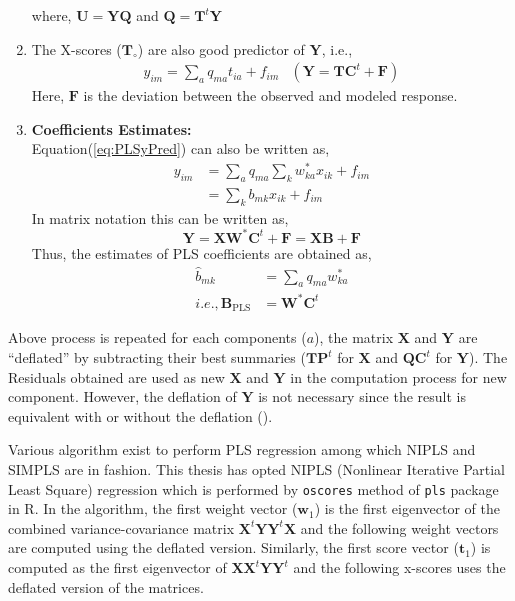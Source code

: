 \documentclass[12pt, lot, lof]{thesis}\usepackage[]{graphicx}\usepackage[]{color}
\newcommand{\bs}[1]{\ensuremath{\boldsymbol{#1}}}
\begin{document}
\begin{enumerate}
{where, $\bs{U}=\bs{YQ}$ and $\bs{Q}=\bs{T}^t\bs{Y}$
}
\item{
The X-scores ($\bs{T_\circ}$) are also good predictor of \bs{Y}, i.e.,
\begin{eqnarray}
\label{eq:PLSyPred}
y_{im}=\sum_a{q_{ma}t_{ia}+f_{im}} & (\bs{Y}=\bs{TC}^t+\bs{F})
\end{eqnarray}
Here, \bs{F} is the deviation between the observed and modeled response.
}
\item{
\textbf{Coefficients Estimates:}\\
Equation(\ref{eq:PLSyPred}) can also be written as,
\begin{align*}
y_{im}&=\sum_a{q_{ma}\sum_k{w_{ka}^*x_{ik}}}+f_{im}\\
&=\sum_k{b_{mk}x_{ik}}+f_{im}
\end{align*}
In matrix notation this can be written as,
\begin{equation}
\bs{Y}=\bs{XW}^*\bs{C}^t+\bs{F}=\bs{XB}+\bs{F}
\end{equation}
Thus, the estimates of PLS coefficients are obtained as,
\begin{align}
\hat{b}_{mk}&=\sum_a{q_{ma}w_{ka}^*}\\
i.e., \bs{B}_\text{PLS} &= \bs{W}^*\bs{C}^t
\end{align}
}
\end{enumerate}
Above process is repeated for each components ($a$), the matrix \bs{X} and \bs{Y} are ``deflated'' by subtracting their best summaries ($\bs{TP}^t$ for \bs{X} and $\bs{QC}^t$ for \bs{Y}). The Residuals obtained are used as new \bs{X} and \bs{Y} in the computation process for new component. However, the deflation of \bs{Y} is not necessary since the result is equivalent with or without the deflation (\cite[p.~5]{wold2001pls}).

Various algorithm exist to perform PLS regression among which NIPLS and SIMPLS are in fashion. This thesis has opted NIPLS (Nonlinear Iterative Partial Least Square) regression which is performed by \texttt{oscores} method of \texttt{pls} package in R. In the algorithm, the first weight vector ($\bs{w}_1$) is the first eigenvector of the combined variance-covariance matrix $\bs{X}^t\bs{YY}^t\bs{X}$ and the following weight vectors are computed using the deflated version. Similarly, the first score vector ($\bs{t}_1$) is computed as the first eigenvector of $\bs{XX}^t\bs{YY}^t$ and the following x-scores uses the deflated version of the matrices.
\end{document}
